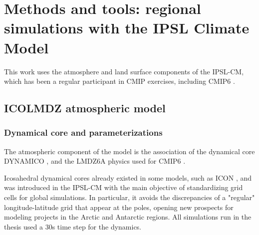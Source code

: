 \chapter{Methods and tools: regional simulations with the IPSL Climate Model}
\label{chap:methods}
\minitoc
\pagebreak

This work uses the atmosphere and land surface components of the IPSL-CM, which has been a regular participant in CMIP exercises, including CMIP6 \citep{boucher_presentation_2020}. 

\section{ICOLMDZ atmospheric model}
\subsection{Dynamical core and parameterizations}
The atmospheric component of the model is the association of the dynamical core DYNAMICO \citep{dubos_dynamico-10_2015}, and the LMDZ6A physics used for CMIP6 \citep{hourdin_lmdz6a_2020}. 

Icosahedral dynamical cores already existed in some models, such as ICON \citep{zangl_icon_2015,giorgetta_icon-_2018,prill_icon_nodate}
, and was introduced in the IPSL-CM with the main objective of standardizing grid cells for global simulations. In particular, it avoids the discrepancies of a "regular" longitude-latitude grid that appear at the poles, opening new prospects for modeling projects in the Arctic %
and Antarctic regions. %
All simulations run in the thesis used a 30s time step for the dynamics.

